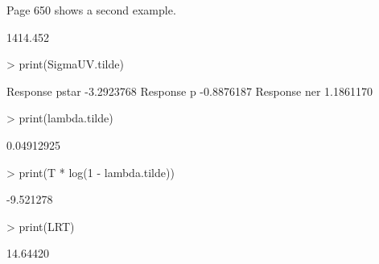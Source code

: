 Page 650 shows a second example.
\begin{Schunk}
\begin{Soutput}
         [,1]
[1,] 1414.452
\end{Soutput}
\begin{Sinput}
> print(SigmaUV.tilde)
\end{Sinput}
\begin{Soutput}
                     [,1]
Response pstar -3.2923768
Response p     -0.8876187
Response ner    1.1861170
\end{Soutput}
\begin{Sinput}
> print(lambda.tilde)
\end{Sinput}
\begin{Soutput}
[1] 0.04912925
\end{Soutput}
\begin{Sinput}
> print(T * log(1 - lambda.tilde))
\end{Sinput}
\begin{Soutput}
[1] -9.521278
\end{Soutput}
\begin{Sinput}
> print(LRT)
\end{Sinput}
\begin{Soutput}
[1] 14.64420
\end{Soutput}
\end{Schunk}
